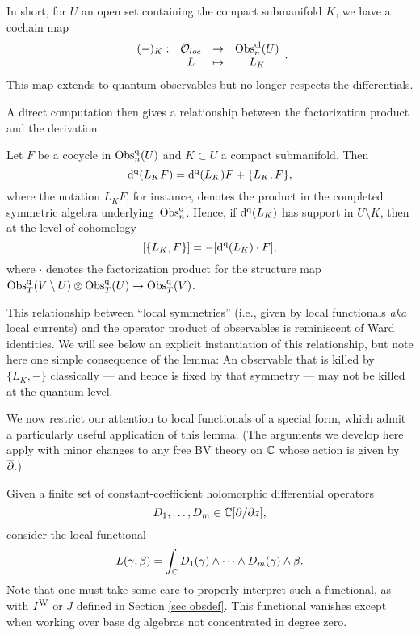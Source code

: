 In short, for $U$ an open set containing the compact submanifold $K$, we have a cochain map
\[
\begin{array}{cccc}
(-)_K: & \mathcal O_{loc} & \to & {\rm Obs}_n^{\rm cl}(U) \\
& L & \mapsto & L_K
\end{array}.
\]
This map extends to quantum observables but no longer respects the differentials.

A direct computation then gives a relationship between the factorization product and the derivation.

\begin{lemma}
Let $F$ be a cocycle in ${\rm Obs}_n^{\rm q}(U)$ and $K \subset U$ a compact submanifold.
Then
\[
{\rm d}^{\rm q}(L_K F) = {\rm d}^{\rm q}(L_K)F + \{ L_K, F\},
\]
where the notation $L_K F$, for instance, denotes the product in the completed symmetric algebra underlying~${\rm Obs}^{\rm q}_n$.
Hence, if ${\rm d}^{\rm q}(L_K)$ has support in $U\setminus K$, then at the level of cohomology
\[
[\{ L_K, F\}] = - [ {\rm d}^{\rm q}(L_K) \cdot F],
\]
where $\cdot$ denotes the factorization product for the structure map 
${\rm Obs}_T^{\rm q}(V \setminus U) \otimes {\rm Obs}_T^{\rm q}(U) \to {\rm Obs}_T^{\rm q}(V)$.
\end{lemma}

\begin{rmk}
This relationship between ``local symmetries'' (i.e., given by local functionals {\em aka} local currents) and the operator product of observables is reminiscent of Ward identities.
We will see below an explicit instantiation of this relationship,
but note here one simple consequence of the lemma:
An observable that is killed by $\{L_K,-\}$ classically --- and hence is fixed by that symmetry --- 
may not be killed at the quantum level.
\end{rmk}

We now restrict our attention to local functionals of a special form,
which admit a particularly useful application of this lemma.
(The arguments we develop here apply with minor changes 
to any free BV theory on $\mathbb C$ whose action is given by~$\overline{\partial}.$)

Given a finite set of constant-coefficient holomorphic differential operators
\[
D_1,\ldots,D_m \in \mathbb C[\partial/\partial z],
\]
consider the local functional
\[
L(\gamma,\beta) = \int_\mathbb C D_1(\gamma) \wedge \cdots \wedge D_m(\gamma) \wedge \beta.
\]
Note that one must take some care to properly interpret such a functional, 
as with $I^{{\rm W}}$ or $J$ defined in Section \ref{sec obsdef}. 
This functional vanishes except when working over base dg algebras not concentrated in degree zero.


